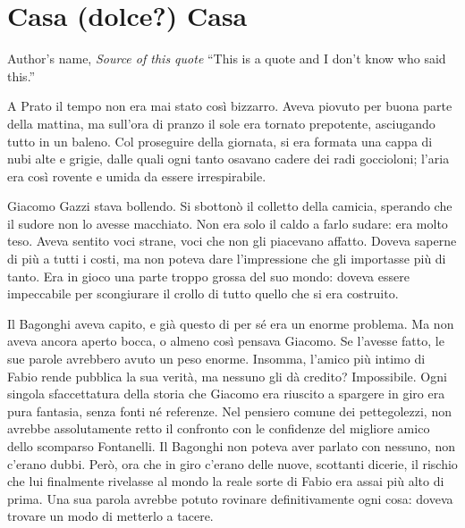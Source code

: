 \chapter{Casa (dolce?) Casa}

\begin{chapquote}{Author's name, \textit{Source of this quote}}
``This is a quote and I don't know who said this.''
\end{chapquote}



A Prato il tempo non era mai stato così bizzarro. Aveva piovuto per buona parte della mattina, ma sull'ora di pranzo il sole era tornato prepotente, asciugando tutto in un baleno. Col proseguire della giornata, si era formata una cappa di nubi alte e grigie, dalle quali ogni tanto osavano cadere dei radi goccioloni; l'aria era così rovente e umida da essere irrespirabile.

Giacomo Gazzi stava bollendo. Si sbottonò il colletto della camicia, sperando che il sudore non lo avesse macchiato. Non era solo il caldo a farlo sudare: era molto teso. Aveva sentito voci strane, voci che non gli piacevano affatto. Doveva saperne di più a tutti i costi, ma non poteva dare l'impressione che gli importasse più di tanto. Era in gioco una parte troppo grossa del suo mondo: doveva essere impeccabile per scongiurare il crollo di tutto quello che si era costruito.

Il Bagonghi aveva capito, e già questo di per sé era un enorme problema. Ma non aveva ancora aperto bocca, o almeno così pensava Giacomo. Se l'avesse fatto, le sue parole avrebbero avuto un peso enorme. Insomma, l'amico più intimo di Fabio rende pubblica la sua verità, ma nessuno gli dà credito? Impossibile. Ogni singola sfaccettatura della storia che Giacomo era riuscito a spargere in giro era pura fantasia, senza fonti né referenze. Nel pensiero comune dei pettegolezzi, non avrebbe assolutamente retto il confronto con le confidenze del migliore amico dello scomparso Fontanelli. Il Bagonghi non poteva aver parlato con nessuno, non c'erano dubbi. Però, ora che in giro c'erano delle nuove, scottanti dicerie, il rischio che lui finalmente rivelasse al mondo la reale sorte di Fabio era assai più alto di prima. Una sua parola avrebbe potuto rovinare definitivamente ogni cosa: doveva trovare un modo di metterlo a tacere.

